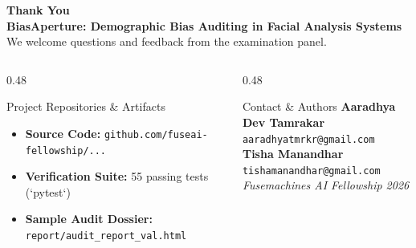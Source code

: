 {
\begin{frame}[plain]

  \vspace{0.8cm}
  \begin{center}
    {\fontsize{18pt}{22pt}\selectfont\bfseries\color{FuseDarkNavy}Thank You}\\[0.3cm]
    {\fontsize{11pt}{14pt}\selectfont\color{FuseBlue}\textbf{BiasAperture: Demographic Bias Auditing in Facial Analysis Systems}}\\[0.2cm]
    {\fontsize{9.5pt}{12pt}\selectfont\color{FuseTextMuted}We welcome questions and feedback from the examination panel.}
  \end{center}

  \vspace{0.6cm}
  \vspace{0.4cm}

  \begin{columns}[T]
    \begin{column}{0.48\textwidth}
      \begin{card}{Project Repositories \& Artifacts}
        \footnotesize
        \begin{itemize}
          \item \textbf{Source Code:} \texttt{github.com/fuseai-fellowship/...}
          \item \textbf{Verification Suite:} 55 passing tests (`pytest`)
          \item \textbf{Sample Audit Dossier:} \texttt{report/audit\_report\_val.html}
        \end{itemize}
      \end{card}
    \end{column}

    \begin{column}{0.48\textwidth}
      \begin{card}{Contact \& Authors}
        \footnotesize
        \textbf{Aaradhya Dev Tamrakar} \\
        \texttt{aaradhyatmrkr@gmail.com} \\[0.2cm]
        \textbf{Tisha Manandhar} \\
        \texttt{tishamanandhar@gmail.com} \\[0.2cm]
        \small \textit{Fusemachines AI Fellowship 2026}
      \end{card}
    \end{column}
  \end{columns}
\end{frame}
}
